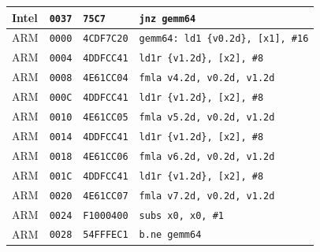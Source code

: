 \begin{table}[htbp]
\begin{tabular}{@{}l|l|l|p{7.2cm}@{}}
Intel & \texttt{0037} & \texttt{75C7} & \texttt{jnz gemm64} \\
\midrule
ARM & \texttt{0000} & \texttt{4CDF7C20} & \texttt{gemm64: ld1 \{v0.2d\}, [x1], \#16} \\
ARM & \texttt{0004} & \texttt{4DDFCC41} & \texttt{ld1r \{v1.2d\}, [x2], \#8} \\
ARM & \texttt{0008} & \texttt{4E61CC04} & \texttt{fmla v4.2d, v0.2d, v1.2d} \\
ARM & \texttt{000C} & \texttt{4DDFCC41} & \texttt{ld1r \{v1.2d\}, [x2], \#8} \\
ARM & \texttt{0010} & \texttt{4E61CC05} & \texttt{fmla v5.2d, v0.2d, v1.2d} \\
ARM & \texttt{0014} & \texttt{4DDFCC41} & \texttt{ld1r \{v1.2d\}, [x2], \#8} \\
ARM & \texttt{0018} & \texttt{4E61CC06} & \texttt{fmla v6.2d, v0.2d, v1.2d} \\
ARM & \texttt{001C} & \texttt{4DDFCC41} & \texttt{ld1r \{v1.2d\}, [x2], \#8} \\
ARM & \texttt{0020} & \texttt{4E61CC07} & \texttt{fmla v7.2d, v0.2d, v1.2d} \\
ARM & \texttt{0024} & \texttt{F1000400} & \texttt{subs x0, x0, \#1} \\
ARM & \texttt{0028} & \texttt{54FFFEC1} & \texttt{b.ne gemm64} \\
\bottomrule
\end{tabular}
\endgroup
\end{table}
\noindent{}\par

